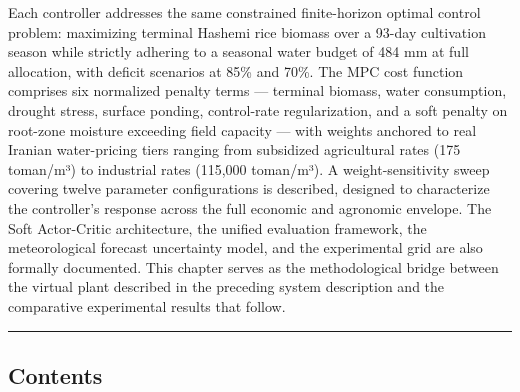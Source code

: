 Each controller addresses the same constrained finite-horizon optimal
control problem: maximizing terminal Hashemi rice biomass over a 93-day
cultivation season while strictly adhering to a seasonal water budget of
484 mm at full allocation, with deficit scenarios at 85\% and 70\%. The
MPC cost function comprises six normalized penalty terms --- terminal
biomass, water consumption, drought stress, surface ponding,
control-rate regularization, and a soft penalty on root-zone moisture
exceeding field capacity --- with weights anchored to real Iranian
water-pricing tiers ranging from subsidized agricultural rates (175
toman/m³) to industrial rates (115,000 toman/m³). A weight-sensitivity
sweep covering twelve parameter configurations is described, designed to
characterize the controller's response across the full economic and
agronomic envelope. The Soft Actor-Critic architecture, the unified
evaluation framework, the meteorological forecast uncertainty model, and
the experimental grid are also formally documented. This chapter serves
as the methodological bridge between the virtual plant described in the
preceding system description and the comparative experimental results
that follow.

\begin{center}\rule{0.5\linewidth}{0.5pt}\end{center}

\subsection{Contents}\label{contents}


